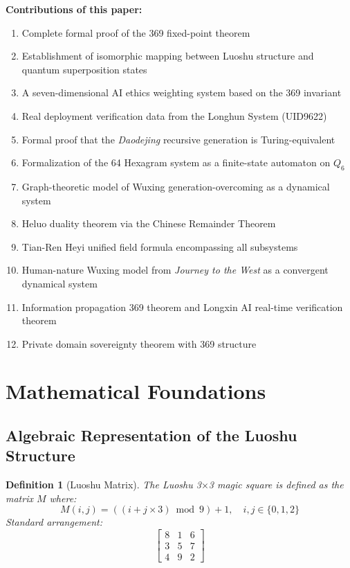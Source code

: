 \documentclass[conference]{IEEEtran}
\newtheorem{definition}[theorem]{Definition}
\theoremstyle{remark}
\begin{document}
\textbf{Contributions of this paper:}
\begin{enumerate}[nosep]
\item Complete formal proof of the 369 fixed-point theorem
\item Establishment of isomorphic mapping between Luoshu structure and quantum superposition states
\item A seven-dimensional AI ethics weighting system based on the 369 invariant
\item Real deployment verification data from the Longhun System (UID9622)
\item Formal proof that the \emph{Daodejing} recursive generation is Turing-equivalent
\item Formalization of the 64 Hexagram system as a finite-state automaton on $Q_6$
\item Graph-theoretic model of Wuxing generation-overcoming as a dynamical system
\item Heluo duality theorem via the Chinese Remainder Theorem
\item Tian-Ren Heyi unified field formula encompassing all subsystems
\item Human-nature Wuxing model from \emph{Journey to the West} as a convergent dynamical system
\item Information propagation 369 theorem and Longxin AI real-time verification theorem
\item Private domain sovereignty theorem with 369 structure
\end{enumerate}

\section{Mathematical Foundations}

\subsection{Algebraic Representation of the Luoshu Structure}

\begin{definition}[Luoshu Matrix]
The Luoshu 3$\times$3 magic square is defined as the matrix $M$ where:
\[
M(i,j) = ((i + j \times 3) \bmod 9) + 1,\quad i,j \in \{0,1,2\}
\]
Standard arrangement:
\[
\begin{bmatrix}
8 & 1 & 6 \\
3 & 5 & 7 \\
4 & 9 & 2
\end{bmatrix}
\]
\end{definition}
\end{document}
